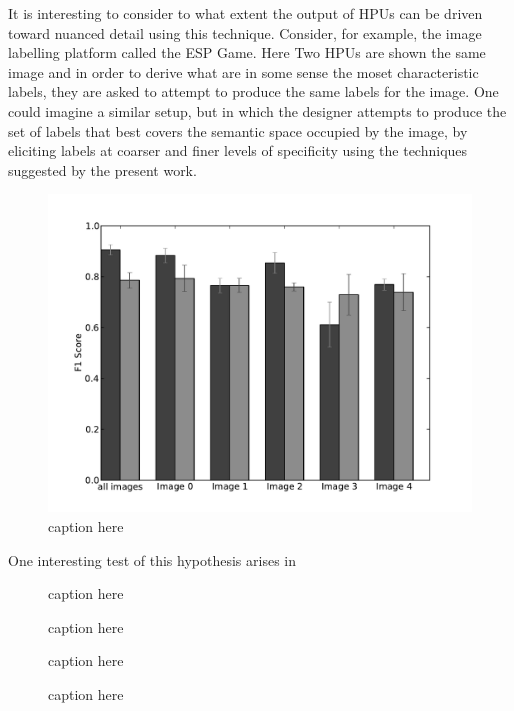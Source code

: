\documentclass[letterpaper, 11pt, twocolumn]{article}
\begin{document}
It is interesting to consider to what extent the output of HPUs can be driven
toward nuanced detail using this technique.  Consider, for example, the 
image labelling platform called the ESP Game.  Here Two HPUs are shown
the same image and in order to derive what are in some sense the moset 
characteristic labels, they are asked to attempt to produce the same labels
for the image.  One could imagine a similar setup, but in which the designer
attempts to produce the set of labels that best covers the semantic space 
occupied by the image, by eliciting labels at coarser and finer levels of 
specificity using the techniques suggested by the present work.

\begin{figure}
	\includegraphics[scale=0.4]{../figs/longitude0.pdf}
	\caption{caption here}
	\label{fig:longitude}
\end{figure}


One interesting test of this hypothesis arises in 
\begin{figure}
	\caption{caption here}
	\label{fig:testImages}
\end{figure}

\begin{figure}
	\caption{caption here}
	\label{fig:ambiguous}
\end{figure}

\begin{figure}
	\caption{caption here}
	\label{fig:cultural}
\end{figure}

\begin{figure}
	\caption{caption here}
	\label{fig:ingredients}
\end{figure}



\end{document}
